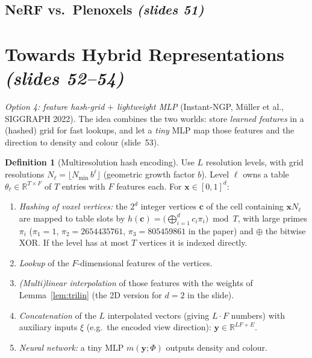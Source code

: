 \documentclass[11pt,a4paper]{article}
\newcommand{\sref}[1]{\texorpdfstring{\emph{(slides #1)}}{(slides #1)}}
\newcommand{\R}{\mathbb{R}}
\newcommand{\xx}{\boldsymbol{x}}
\theoremstyle{definition}
\newtheorem{definition}{Definition}[section]
\theoremstyle{plain}
\theoremstyle{remark}
\begin{document}
\subsection{NeRF vs.\ Plenoxels \sref{51}}


\section{Towards Hybrid Representations \sref{52--54}}

\emph{Option 4: feature hash-grid $+$ lightweight MLP} (Instant-NGP, M\"uller et al., SIGGRAPH 2022). The idea combines the two worlds: store \emph{learned features} in a (hashed) grid for fast lookups, and let a \emph{tiny} MLP map those features and the direction to density and colour (slide~53).

\begin{definition}[Multiresolution hash encoding]\label{def:hash}
Use $L$ resolution levels, with grid resolutions $N_\ell=\lfloor N_{\min}\,b^{\ell}\rfloor$ (geometric growth factor $b$). Level $\ell$ owns a table $\theta_\ell\in\R^{T\times F}$ of $T$ entries with $F$ features each. For $\xx\in[0,1]^d$:
\begin{enumerate}[nosep]
\item \emph{Hashing of voxel vertices:} the $2^d$ integer vertices $\boldsymbol c$ of the cell containing $\xx N_\ell$ are mapped to table slots by $h(\boldsymbol c)=\big(\bigoplus_{i=1}^dc_i\pi_i\big)\bmod T$, with large primes $\pi_i$ ($\pi_1=1$, $\pi_2=2654435761$, $\pi_3=805459861$ in the paper) and $\oplus$ the bitwise XOR. If the level has at most $T$ vertices it is indexed directly.
\item \emph{Lookup} of the $F$-dimensional features of the vertices.
\item \emph{(Multi)linear interpolation} of those features with the weights of Lemma~\ref{lem:trilin} (the 2D version for $d=2$ in the slide).
\item \emph{Concatenation} of the $L$ interpolated vectors (giving $L\cdot F$ numbers) with auxiliary inputs $\xi$ (e.g.\ the encoded view direction): $\boldsymbol y\in\R^{LF+E}$.
\item \emph{Neural network:} a tiny MLP $m(\boldsymbol y;\Phi)$ outputs density and colour.
\end{enumerate}
\end{definition}
\end{document}
